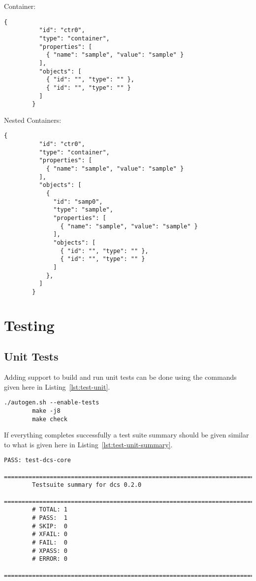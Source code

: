 \documentclass[11pt]{article}
\begin{document}
      Container:

      \begin{lstlisting}[caption={Container Configuration in JSON},label={lst:cfg-json-ctr}]
        {
          "id": "ctr0",
          "type": "container",
          "properties": [
            { "name": "sample", "value": "sample" }
          ],
          "objects": [
            { "id": "", "type": "" },
            { "id": "", "type": "" }
          ]
        }
      \end{lstlisting}

      Nested Containers:

      \begin{lstlisting}[caption={Nested Container Configuration in JSON},label={lst:cfg-json-ctr}]
        {
          "id": "ctr0",
          "type": "container",
          "properties": [
            { "name": "sample", "value": "sample" }
          ],
          "objects": [
            {
              "id": "samp0",
              "type": "sample",
              "properties": [
                { "name": "sample", "value": "sample" }
              ],
              "objects": [
                { "id": "", "type": "" },
                { "id": "", "type": "" }
              ]
            },
          ]
        }
      \end{lstlisting}

  \section{Testing}\label{sec:test}

    \subsection{Unit Tests}\label{sec:test-unit}

      Adding support to build and run unit tests can be done using the commands given here
      in Listing~\ref{lst:test-unit}.

      \begin{lstlisting}[caption={Compiling and Running Unit Tests},label={lst:test-unit}]
        ./autogen.sh --enable-tests
        make -j8
        make check
      \end{lstlisting}

      If everything completes successfully a test suite summary should be given similar to
      what is given here in Listing~\ref{lst:test-unit-summary}.

      \begin{lstlisting}[caption={Test Suite Summary},label={lst:test-unit-summary}]
        PASS: test-dcs-core
        ============================================================================
        Testsuite summary for dcs 0.2.0
        ============================================================================
        # TOTAL: 1
        # PASS:  1
        # SKIP:  0
        # XFAIL: 0
        # FAIL:  0
        # XPASS: 0
        # ERROR: 0
        ============================================================================
      \end{lstlisting}
\end{document}
